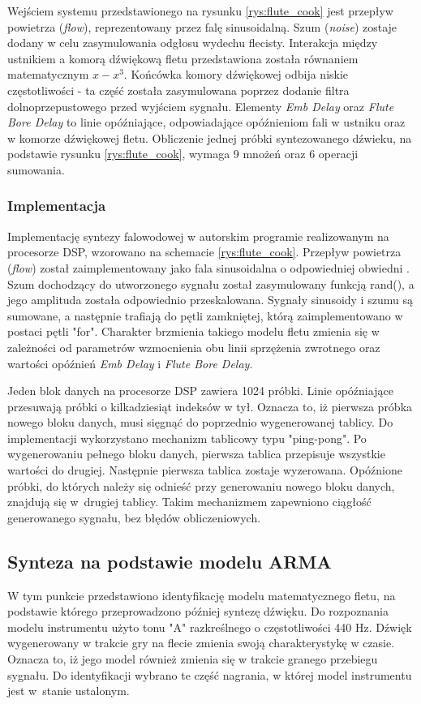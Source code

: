 Wejściem systemu przedstawionego na rysunku \ref{rys:flute_cook} jest przepływ powietrza (\emph{flow}), reprezentowany przez falę sinusoidalną. Szum (\emph{noise}) zostaje dodany w celu zasymulowania odgłosu wydechu flecisty. 
Interakcja między ustnikiem a komorą dźwiękową fletu przedstawiona została równaniem matematycznym $x-x^3$. Końcówka komory dźwiękowej odbija niskie częstotliwości - ta część została zasymulowana poprzez dodanie filtra dolnoprzepustowego przed wyjściem sygnału. Elementy \emph{Emb Delay} oraz \emph{Flute Bore Delay} to linie opóźniające, odpowiadające opóźnieniom fali w ustniku oraz w komorze dźwiękowej fletu. 
Obliczenie jednej próbki syntezowanego dźwieku, na podstawie rysunku \ref{rys:flute_cook}, wymaga 9 mnożeń oraz 6 operacji sumowania.

\subsubsection{Implementacja}
Implementację syntezy falowodowej w autorskim programie realizowanym na procesorze DSP,  wzorowano na schemacie \ref{rys:flute_cook}. Przepływ powietrza (\emph{flow}) został zaimplementowany jako fala sinusoidalna o odpowiedniej obwiedni \cite{flute_prezka}. Szum dochodzący do utworzonego sygnału został zasymulowany funkcją rand(), a jego amplituda została odpowiednio przeskalowana. Sygnały sinusoidy i szumu są sumowane, a następnie trafiają do pętli zamkniętej, którą zaimplementowano w postaci pętli "for". Charakter brzmienia takiego modelu fletu zmienia się w zależności od parametrów wzmocnienia obu linii sprzężenia zwrotnego oraz wartości opóźnień \emph{Emb Delay} i \emph{Flute Bore Delay}.

Jeden blok danych na procesorze DSP zawiera 1024 próbki. Linie opóźniające przesuwają próbki o kilkadziesiąt indeksów w tył. Oznacza to, iż pierwsza próbka nowego bloku danych, musi sięgnąć do poprzednio wygenerowanej tablicy. Do implementacji wykorzystano mechanizm tablicowy typu "ping-pong". Po wygenerowaniu pełnego bloku danych, pierwsza tablica przepisuje wszystkie wartości do drugiej. Następnie pierwsza tablica zostaje wyzerowana. Opóźnione próbki, do których należy się odnieść przy generowaniu nowego bloku danych, znajdują się w~drugiej tablicy. Takim mechanizmem zapewniono ciągłość generowanego sygnału, bez błędów obliczeniowych.

\subsection{Synteza na podstawie modelu ARMA}
W tym punkcie przedstawiono identyfikację modelu matematycznego fletu, na podstawie którego przeprowadzono później syntezę dźwięku. Do rozpoznania modelu instrumentu użyto tonu "A" razkreślnego o częstotliwości 440 Hz. Dźwięk wygenerowany w trakcie gry na flecie zmienia swoją charakterystykę w czasie. Oznacza to, iż jego model również zmienia się w trakcie granego przebiegu sygnału. Do identyfikacji wybrano te część nagrania, w której model instrumentu jest w~stanie ustalonym.

